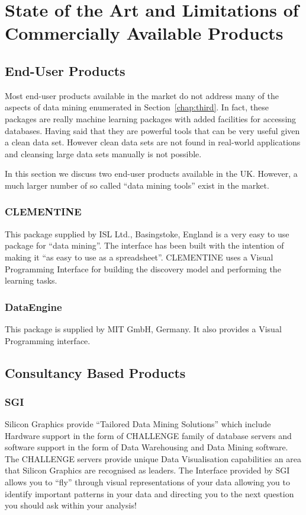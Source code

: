 \documentclass[a4paper,12pt,notitlepage,pdftex]{scrreprt}
\begin{document}
\chapter{State of the Art and Limitations of Commercially Available Products}
    \section{End-User Products}
        Most end-user products available in the market do not address many of the aspects of data mining enumerated in
        Section~\ref{chap:third}.
        In fact, these packages are really machine learning packages with added facilities for accessing databases.
        Having said that they are powerful tools that can be very useful given a clean data set.
        However clean data sets are not found in real-world applications and cleansing large data sets manually is not
        possible.

        In this section we discuss two end-user products available in the UK\@.
        However, a much larger number of so called ``data mining tools'' exist in the market.

        \subsection{CLEMENTINE}
            This package supplied by ISL Ltd., Basingstoke, England is a very easy to use package for ``data mining''.
            The interface has been built with the intention of making it ``as easy to use as a spreadsheet''.
            CLEMENTINE uses a Visual Programming Interface for building the discovery model and performing the
            learning tasks.

        \subsection{DataEngine}
            This package is supplied by MIT GmbH, Germany.
            It also provides a Visual Programming interface.
    \section{Consultancy Based Products}
        \subsection{SGI}
            Silicon Graphics provide ``Tailored Data Mining Solutions'' which include Hardware support in the form of
            CHALLENGE family of database servers and software support in the form of Data Warehousing and Data Mining
            software.
            The CHALLENGE servers provide unique Data Visualisation capabilities an area that Silicon Graphics are
            recognised as leaders.
            The Interface provided by SGI allows you to ``fly'' through visual representations of your data allowing
            you to identify important patterns in your data and directing you to the next question you should ask
            within your analysis!
\end{document}
